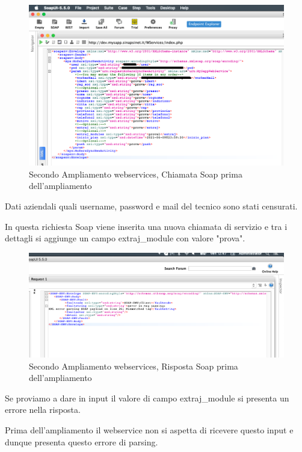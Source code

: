 \begin{figure}[!h] 
	\centering
	\includegraphics[scale = 0.5]{immagini/webservices/ampliamenti/accettazione/2ampl_soap_chiamata_premodifica.png}
	\caption{Secondo Ampliamento webservices, Chiamata  Soap prima dell'ampliamento}
\end{figure}
\begin{flushleft}
	Dati aziendali quali username, password e mail del tecnico sono stati censurati.
	
	In questa richiesta Soap viene inserita una nuova chiamata di servizio e tra i dettagli si aggiunge un campo extraj\_module con valore "prova".
\end{flushleft}
\begin{figure}[!h] 
	\centering
	\includegraphics[scale = 0.5]{immagini/webservices/ampliamenti/accettazione/2ampl_soap_risposta_premodifica.png}
	\caption{Secondo Ampliamento webservices, Risposta Soap prima dell'ampliamento}
\end{figure}
\begin{flushleft}
	Se proviamo a dare in input il valore di campo extraj\_module si presenta un errore nella risposta.
	
	Prima dell'ampliamento il webservice non si aspetta di ricevere questo input e dunque presenta questo errore di parsing.
\end{flushleft}
\newpage

